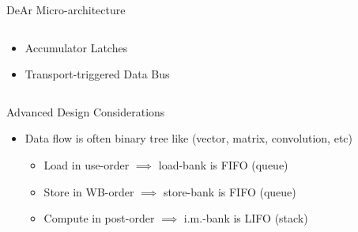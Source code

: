 \documentclass{beamer}
\begin{document}
\begin{CJK}{UTF8}{bkai}
\begin{frame}{DeAr Micro-architecture}
\begin{columns}
\begin{column}{0.35\textwidth}
\begin{block}
\begin{itemize}
{\begin{itemize}
                                    \end{itemize}
                                }
                                \item <4->{Accumulator Latches}
                                \item <5->{Transport-triggered Data Bus}
                            \end{itemize}    
                        \end{block}
                    \end{column}
                \end{columns}
            \end{frame}

            \begin{frame}{Advanced Design Considerations}
                \centering
                {
                }
                \pause
                \begin{itemize}
                    \item {Data flow is often binary tree like (vector, matrix, convolution, etc)
                        \begin{itemize}
                                \pause
                            \item Load in use-order $\implies$ load-bank is FIFO (queue)
                                \pause
                            \item Store in WB-order $\implies$ store-bank is FIFO (queue)
                                \pause
                            \item Compute in post-order $\implies$ i.m.-bank is LIFO (stack)
                        \end{itemize}}
                \end{itemize}
            \end{frame}


\end{CJK}
\end{document}

